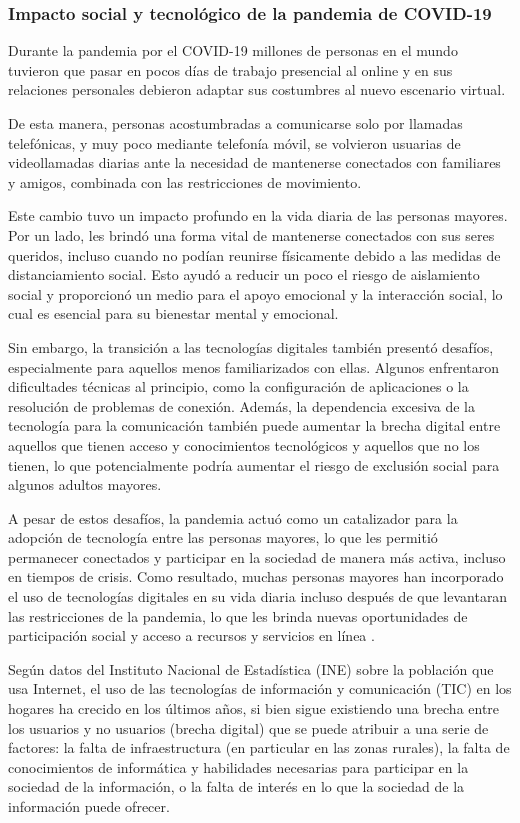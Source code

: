 \subsubsection{Impacto social y tecnológico de la pandemia de COVID-19}

Durante la pandemia por el COVID-19 millones de personas en el mundo tuvieron que pasar en pocos días de trabajo presencial al online y en sus relaciones personales debieron adaptar sus costumbres al nuevo escenario virtual.

De esta manera, personas acostumbradas a comunicarse solo por llamadas telefónicas, y muy poco mediante telefonía móvil, se volvieron usuarias de videollamadas diarias ante la necesidad de mantenerse conectados con familiares y amigos, combinada con las restricciones de movimiento.

Este cambio tuvo un impacto profundo en la vida diaria de las personas mayores. Por un lado, les brindó una forma vital de mantenerse conectados con sus seres queridos, incluso cuando no podían reunirse físicamente debido a las medidas de distanciamiento social. Esto ayudó a reducir un poco el riesgo de aislamiento social y proporcionó un medio para el apoyo emocional y la interacción social, lo cual es esencial para su bienestar mental y emocional.

Sin embargo, la transición a las tecnologías digitales también presentó desafíos, especialmente para aquellos menos familiarizados con ellas. Algunos enfrentaron dificultades técnicas al principio, como la configuración de aplicaciones o la resolución de problemas de conexión. Además, la dependencia excesiva de la tecnología para la comunicación también puede aumentar la brecha digital entre aquellos que tienen acceso y conocimientos tecnológicos y aquellos que no los tienen, lo que potencialmente podría aumentar el riesgo de exclusión social para algunos adultos mayores.

A pesar de estos desafíos, la pandemia actuó como un catalizador para la adopción de tecnología entre las personas mayores, lo que les permitió permanecer conectados y participar en la sociedad de manera más activa, incluso en tiempos de crisis. Como resultado, muchas personas mayores han incorporado el uso de tecnologías digitales en su vida diaria incluso después de que levantaran las restricciones de la pandemia, lo que les brinda nuevas oportunidades de participación social y acceso a recursos y servicios en línea \parencite{intro2}.

Según datos del Instituto Nacional de Estadística (INE) sobre la población que usa Internet, el uso de las tecnologías de información y comunicación (TIC) en los hogares ha crecido en los últimos años, si bien sigue existiendo una brecha entre los usuarios y no usuarios (brecha digital) que se puede atribuir a una serie de factores: la falta de infraestructura (en particular en las zonas rurales), la falta de conocimientos de informática y habilidades necesarias para participar en la sociedad de la información, o la falta de interés en lo que la sociedad de la información puede ofrecer.

